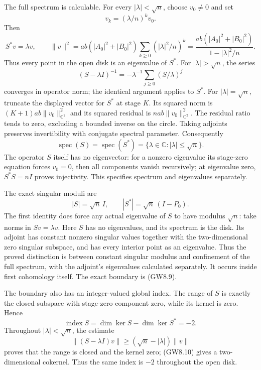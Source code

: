 The full spectrum is calculable. For every \(|\lambda|<\sqrt n\), choose
\(v_0\ne0\) and set \[
v_k=(\lambda/n)^k v_0.
\] Then \[
S^*v=\lambda v,
\qquad
\|v\|^2=ab(|A_0|^2+|B_0|^2)
\sum_{k\ge0}(|\lambda|^2/n)^k
=\frac{ab(|A_0|^2+|B_0|^2)}{1-|\lambda|^2/n}.
\tag{GW8.10}
\] Thus every point in the open disk is an eigenvalue of \(S^*\). For
\(|\lambda|>\sqrt n\), the series \[
(S-\lambda I)^{-1}=-\lambda^{-1}\sum_{j\ge0}(S/\lambda)^j
\] converges in operator norm; the identical argument applies to
\(S^*\). For \(|\lambda|=\sqrt n\), truncate the displayed vector for
\(S^*\) at stage \(K\). Its squared norm is
\((K+1)ab\|v_0\|_{\mathbb C^2}^2\) and its squared residual is
\(nab\|v_0\|_{\mathbb C^2}^2\). The residual ratio tends to zero,
excluding a bounded inverse on the circle. Taking adjoints preserves
invertibility with conjugate spectral parameter. Consequently \[
\operatorname{spec}(S)=\operatorname{spec}(S^*)
=\{\lambda\in\mathbb C:|\lambda|\le\sqrt n\}.
\tag{GW8.11}
\] The operator \(S\) itself has no eigenvector: for a nonzero
eigenvalue its stage-zero equation forces \(v_0=0\), then all components
vanish recursively; at eigenvalue zero, \(S^*S=nI\) proves injectivity.
This specifies spectrum and eigenvalues separately.

The exact singular moduli are \[
|S|=\sqrt n\,I,\qquad |S^*|=\sqrt n\,(I-P_0).
\tag{GW8.12}
\] The first identity does force any actual eigenvalue of \(S\) to have
modulus \(\sqrt n\): take norms in \(Sv=\lambda v\). Here \(S\) has no
eigenvalues, and its spectrum is the disk. Its adjoint has constant
nonzero singular values together with the two-dimensional zero singular
subspace, and has every interior point as an eigenvalue. Thus the proved
distinction is between constant singular modulus and confinement of the
full spectrum, with the adjoint's eigenvalues calculated separately. It
occurs inside first cohomology itself. The exact boundary is (GW8.9).

The boundary also has an integer-valued global index. The range of \(S\)
is exactly the closed subspace with stage-zero component zero, while its
kernel is zero. Hence \[
\operatorname{index}S=\dim\ker S-\dim\ker S^*=-2.
\tag{GW8.13}
\] Throughout \(|\lambda|<\sqrt n\), the estimate \[
\|(S-\lambda I)v\|\ge(\sqrt n-|\lambda|)\|v\|
\] proves that the range is closed and the kernel zero; (GW8.10) gives a
two-dimensional cokernel. Thus the same index is \(-2\) throughout the
open disk.

